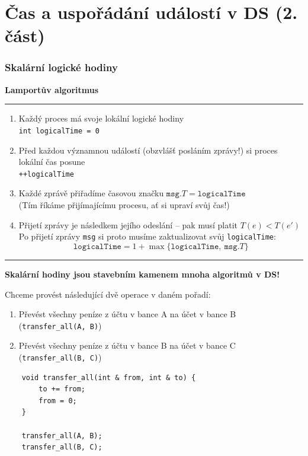 \documentclass[usenames,dvipsnames,9pt]{beamer}
\begin{document}
\section{Čas a uspořádání událostí v DS  (2. část)}

\begin{frame}
  \frametitle{Skalární logické hodiny}

  \begin{center}
    \LARGE {\bf Lamportův algoritmus}
  \end{center}

  \vspace{1em}\hrule\vspace{1em}

  \begin{enumerate}
  	\item Každý proces má svoje lokální logické hodiny \\
  	            \texttt{int logicalTime = 0}
  	\item Před každou významnou událostí (obzvlášť posláním zprávy!) si proces lokální čas posune \\
  				\texttt{++logicalTime}
  	\item Každé zprávě přiřadíme časovou značku $\texttt{msg.}T = \texttt{logicalTime}$ \\
  				{\small (Tím říkáme přijímajícímu procesu, ať si upraví svůj čas!)}
  	\item Přijetí zprávy je následkem jejího odeslání -- pak musí platit $T(e) < T(e')$ \\
  				Po přijetí zprávy \texttt{msg} si proto musíme zaktualizovat svůj \texttt{logicalTime}:
  				\[ \texttt{logicalTime} = 1 + \max \lbrace \texttt{logicalTime},\ \texttt{msg.}T \rbrace \]
  \end{enumerate}
  
  \vspace{1em}\hrule\vspace{1em}

  \pause\faWarning \hspace{3pt}
    \textbf{Skalární hodiny jsou stavebním kamenem mnoha algoritmů v DS!}
\end{frame}


\begin{frame}[fragile]
  Chceme provést následující dvě operace v daném pořadí:
  \begin{enumerate}
    \item Převést všechny peníze z účtu v bance A na účet v bance B (\texttt{transfer\_all(A, B)})
    \item Převést všechny peníze z účtu v bance B na účet v bance C (\texttt{transfer\_all(B, C)})
  \end{enumerate}

  \begin{verbatim}
  	void transfer_all(int & from, int & to) {
  		to += from;
  		from = 0;
  	}

  	transfer_all(A, B);
  	transfer_all(B, C);
  \end{verbatim}
\end{frame}
\end{document}
